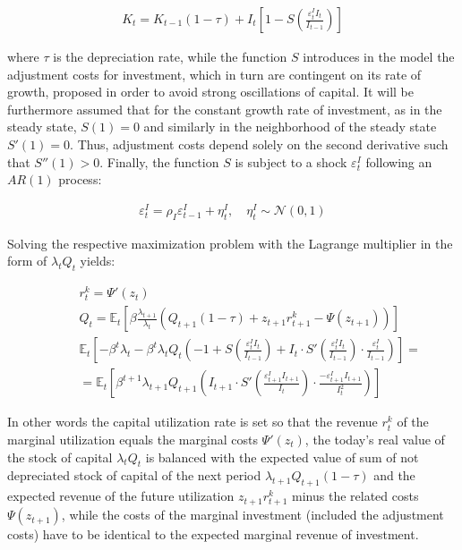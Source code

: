 \documentclass{pracamgr}
\numberwithin{equation}{section}
\begin{document}
\begin{align}
K_{t} = K_{t-1} (1 - \tau) + I_{t} \left[ 1 - S \left(\frac{\varepsilon_{t}^{I}I_{t}}{I_{t-1}} \right) \right]
\end{align}

where $\tau$ is the depreciation rate, while the function $S$ introduces in the model the adjustment costs for investment, which in turn are contingent on its rate of growth, proposed in order to avoid strong oscillations of capital. It will be  furthermore assumed that for the constant growth rate of investment, as in the steady state, $S(1)=0$ and similarly in the neighborhood of the steady state $S'(1) = 0$. Thus, adjustment costs depend solely on the second derivative such that $S''(1)>0$. Finally, the function $S$ is subject to a shock $\varepsilon_{t}^{I}$ following an $AR(1)$ process:

\begin{align}
\varepsilon_{t}^{I} = \rho_{I} \varepsilon_{t-1}^{I} + \eta_{t}^{I}, \quad  \eta_{t}^{I} \sim \mathcal{N} \left(0,1\right)
\end{align}

Solving the respective maximization problem with the Lagrange multiplier in the form of $\lambda_{t} Q_{t}$ yields:

\begin{align}
&r_{t}^{k} = \Psi'(z_{t})  \\
&Q_{t} = \mathbb{E}_{t} \left[ \beta \frac{\lambda_{t+1}}{\lambda_{t}} \left( Q_{t+1}(1-\tau) + z_{t+1}r_{t+1}^{k} - \Psi(z_{t+1}) \right) \right]  \\
&\mathbb{E}_{t} \left[ -\beta^{t} \lambda_{t} - \beta^{t} \lambda_{t} Q_{t} \left(-1 + S\left(\frac{\varepsilon_{t}^{I}I_{t}}{I_{t-1}} \right) + I_{t} \cdot S' \left(\frac{\varepsilon_{t}^{I}I_{t}}{I_{t-1}} \right) \cdot \frac{\varepsilon_{t}^{I}}{I_{t-1}} \right) \right] = \nonumber \\
\qquad &= \mathbb{E}_{t} \left[ \beta^{t+1} \lambda_{t+1} Q_{t+1} \left(I_{t+1} \cdot S' \left(\frac{\varepsilon_{t+1}^{I}I_{t+1}}{I_{t}} \right) \cdot \frac{-\varepsilon_{t+1}^{I} I_{t+1}}{I_{t}^{2}} \right) \right]
\end{align}

In other words the capital utilization rate is set so that the revenue $r_{t}^{k}$ of the marginal utilization equals the marginal costs $\Psi'(z_{t})$, the today's real value of the stock of capital $\lambda_{t} Q_{t}$ is balanced with the expected value of sum of not depreciated stock of capital of the next period $\lambda_{t+1}Q_{t+1}(1-\tau)$ and the expected revenue of the future utilization $ z_{t+1}r_{t+1}^{k}$ minus the related costs $\Psi(z_{t+1})$, while the costs of the marginal investment (included the adjustment costs) have to be identical to the expected marginal revenue of investment.
\end{document}
